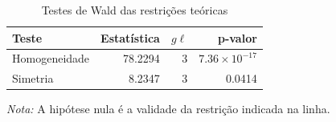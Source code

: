 \begin{table}[H]
\centering
\caption{Testes de Wald das restrições teóricas}
\label{tab:testes-wald}
\small
\begin{tabular}{@{}lrrr@{}}
\toprule
Teste & Estatística & $g\ell$ & p-valor \\
\midrule
Homogeneidade & 78.2294 & 3 & $7.36\times 10^{-17}$ \\
Simetria & 8.2347 & 3 & 0.0414 \\
\bottomrule
\end{tabular}
\par\vspace{0.35em}
\begin{minipage}{0.92\textwidth}\footnotesize \textit{Nota:} A hipótese nula é a validade da restrição indicada na linha.\end{minipage}
\end{table}
